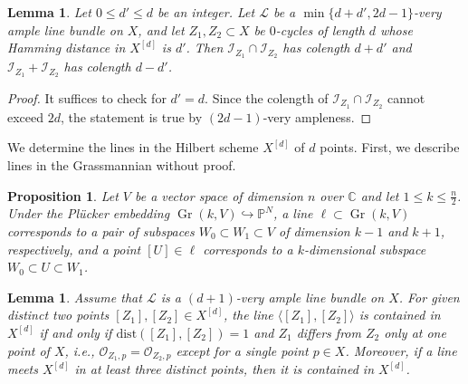 \documentclass[a4paper]{amsart}
\numberwithin{equation}{section}
\theoremstyle{plain}
\newtheorem{lem}[thm]{Lemma}
\newtheorem{prop}[thm]{Proposition}
\theoremstyle{definition}
\theoremstyle{remark}
\numberwithin{figure}{section}
\numberwithin{table}{section}
\numberwithin{equation}{section}
\def \CC {\mathbb{C}}
\def \PP {\mathbb{P}}
\def \Ical {\mathcal{I}}
\def \Lcal {\mathcal{L}}
\def \Ocal {\mathcal{O}}
\DeclareMathOperator{\Gr}{Gr}
\begin{document}
\begin{lem} \label{lem:Hamming-distance-and-length}
    Let $0 \leq d' \leq d$ be an integer.
    Let $\Lcal$ be a $\min \{ d+d', 2d-1 \}$-very ample line bundle on $X$, and let $Z_1, Z_2 \subset X$ be $0$-cycles of length $d$ whose Hamming distance in $X^{[d]}$ is $d'$.
    Then $\Ical_{Z_1} \cap \Ical_{Z_2}$ has colength $d+d'$ and $\Ical_{Z_1} + \Ical_{Z_2}$ has colength $d-d'$.
\end{lem}

\begin{proof}
    It suffices to check for $d' = d$.
    Since the colength of $\Ical_{Z_1} \cap \Ical_{Z_2}$ cannot exceed $2d$, the statement is true by $(2d-1)$-very ampleness.
\end{proof}

We determine the lines in the Hilbert scheme $X^{[d]}$ of $d$ points.
First, we describe lines in the Grassmannian without proof.

\begin{prop} \label{prop:lines-in-Grassmannian}
    Let $V$ be a vector space of dimension $n$ over $\CC$ and let $1 \leq k \leq \frac{n}{2}$.
    Under the Pl\"ucker embedding $\Gr(k,V) \hookrightarrow \PP^N$, a line $\ell \subset \Gr(k,V)$ corresponds to a pair of subspaces $W_0 \subset W_1 \subset V$ of dimension $k-1$ and $k+1$, respectively, and a point $[U] \in \ell$ corresponds to a $k$-dimensional subspace $W_0 \subset U \subset W_1$.
\end{prop}

\begin{lem} \label{lem:lines-in-Hilbert-scheme}
    Assume that $\Lcal$ is a $(d+1)$-very ample line bundle on $X$.
    For given distinct two points $[Z_1], [Z_2] \in X^{[d]}$, the line $\langle [Z_1],[Z_2] \rangle$ is contained in $X^{[d]}$ if and only if $\mathrm{dist}([Z_1],[Z_2]) = 1$ and $Z_1$ differs from $Z_2$ only at one point of $X$, i.e., $\Ocal_{Z_1, p} = \Ocal_{Z_2, p}$ except for a single point $p \in X$.
    Moreover, if a line meets $X^{[d]}$ in at least three distinct points, then it is contained in $X^{[d]}$.
\end{lem}
\end{document}
